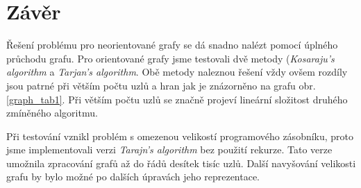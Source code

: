 \documentclass[12pt]{article}
\begin{document}
\section{Závěr}
Řešení problému pro neorientované grafy se dá snadno nalézt pomocí úplného průchodu grafu. Pro orientované grafy jsme testovali dvě metody (\textit{Kosaraju's algorithm} a \textit{Tarjan's algorithm}. Obě metody naleznou řešení vždy ovšem rozdíly jsou patrné při větším počtu uzlů a hran jak je znázorněno na grafu obr. \ref{graph_tab1}. Při větším počtu uzlů se značně projeví lineární složitost druhého zmíněného algoritmu.

Při testování vznikl problém s omezenou velikostí programového zásobníku, proto jsme implementovali verzi \textit{Tarajn's algorithm} bez použití rekurze. Tato verze umožnila zpracování grafů až do řádů desítek tisíc uzlů. Další navyšování velikosti grafu by bylo možné po dalších úpravách jeho reprezentace.

\pagebreak


%
\end{document}
